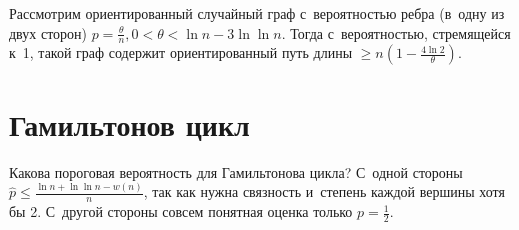 \documentclass{article}
\begin{document}
\begin{corollary}
	Рассмотрим ориентированный случайный граф с~вероятностью ребра (в~одну из двух сторон) $p =
	\frac{\theta}{n}, 0 < \theta < \ln n - 3 \ln \ln n$. Тогда с~вероятностью, стремящейся к~1, такой
	граф содержит ориентированный путь длины $\ge n\left(1 - \frac{4\ln2}{\theta}\right)$.
\end{corollary}

\section{Гамильтонов цикл}

Какова пороговая вероятность для Гамильтонова цикла? С~одной стороны $\hat p \le \frac{\ln n + \ln
\ln n - w(n)}{n}$, так как нужна связность и~степень каждой вершины хотя бы 2. С~другой стороны
совсем понятная оценка только $p = \frac{1}{2}$.
\end{document}
